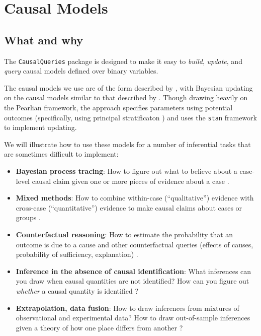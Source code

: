 \documentclass[
  12pt,
]{book}
\providecommand{\tightlist}{%
  \setlength{\itemsep}{0pt}\setlength{\parskip}{0pt}}
\begin{document}
\hypertarget{part-causal-models}{%
\part{Causal Models}\label{part-causal-models}}

\hypertarget{cm}{%
\chapter{What and why}\label{cm}}

The \texttt{CausalQueries} package is designed to make it easy to \emph{build}, \emph{update}, and \emph{query} causal models defined over binary variables.

The causal models we use are of the form described by \citet{pearl2009causality}, with Bayesian updating on the causal models similar to that described by \citet{cowell1999probabilistic}. Though drawing heavily on the Pearlian framework, the approach specifies parameters using potential outcomes (specifically, using principal stratificaton \citep{frangakis2002principal}) and uses the \texttt{stan} framework \citep{carpenter2017stan} to implement updating.

We will illustrate how to use these models for a number of inferential tasks that are sometimes difficult to implement:

\begin{itemize}
\tightlist
\item
  \textbf{Bayesian process tracing}: How to figure out what to believe about a case-level causal claim given one or more pieces of evidence about a case \citep{bennett2015process}.
\item
  \textbf{Mixed methods}: How to combine within-case (``qualitative'') evidence with cross-case (``quantitative'') evidence to make causal claims about cases or groups \citep{humphreys2015mixing}.
\item
  \textbf{Counterfactual reasoning}: How to estimate the probability that an outcome is due to a cause and other counterfactual queries (effects of causes, probability of sufficiency, explanation) \citep{tian2000probabilities}.
\item
  \textbf{Inference in the absence of causal identification}: What inferences can you draw when causal quantities are not identified? How can you figure out \emph{whether} a causal quantity is identified \citep{manski1995identification}?
\item
  \textbf{Extrapolation, data fusion}: How to draw inferences from mixtures of observational and experimental data? How to draw out-of-sample inferences given a theory of how one place differs from another \citep{bareinboim2016causal}?
\end{itemize}
\end{document}
